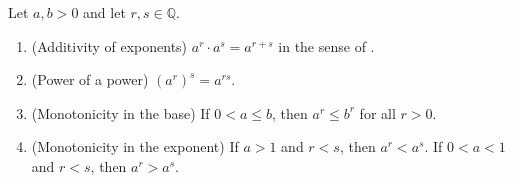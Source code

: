 \begin{theorem} \label{theorem:properties_of_exponentiation_of_real_numbers_by_rational_numbers}
    Let $a,b > 0$ and let $r,s \in \mathbb{Q}$.

    \begin{enumerate}
        \item (Additivity of exponents) $a^r \cdot a^s = a^{r+s}$ in the sense of .
        \item (Power of a power) $\left(a^r\right)^s = a^{rs}$.
        \item (Monotonicity in the base) If $0 < a \leq b$, then $a^r \leq b^r$ for all $r > 0$.
        \item (Monotonicity in the exponent) If $a > 1$ and $r < s$, then $a^r < a^s$. If $0 < a < 1$ and $r < s$, then $a^r > a^s$.
    \end{enumerate}
\end{theorem}

